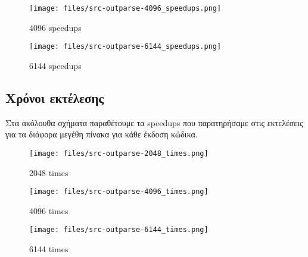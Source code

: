 \begin{figure}[H]
    \centering
    \texttt{[image: files/src-outparse-4096\_speedups.png]}
    \caption{4096 speedups}
    \label{fig:4096_speed}
\end{figure}

\begin{figure}[H]
    \centering
    \texttt{[image: files/src-outparse-6144\_speedups.png]}
    \caption{6144 speedups}
    \label{fig:6144_speed}
\end{figure}




\subsection{Χρόνοι εκτέλεσης}

Στα ακόλουθα σχήματα παραθέτουμε τα speedups που παρατηρήσαμε στις εκτελέσεις
για τα διάφορα μεγέθη πίνακα για κάθε έκδοση κώδικα.


\begin{figure}[H]
    \centering
    \texttt{[image: files/src-outparse-2048\_times.png]}
    \caption{2048 times}
    \label{fig:2048_time}
\end{figure}

\begin{figure}[H]
    \centering
    \texttt{[image: files/src-outparse-4096\_times.png]}
    \caption{4096 times}
    \label{fig:4096_time}
\end{figure}

\begin{figure}[H]
    \centering
    \texttt{[image: files/src-outparse-6144\_times.png]}
    \caption{6144 times}
    \label{fig:6144_time}
\end{figure}








